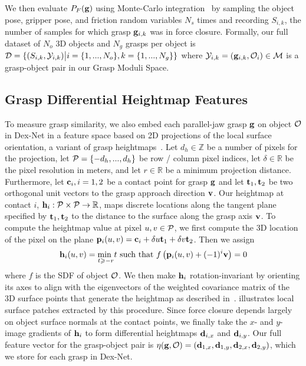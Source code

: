 We then evaluate $P_F(\mathbf{g})$ using Monte-Carlo integration~\cite{kehoe2012toward} by sampling the object pose, gripper pose, and friction random variables $N_s$ times and recording $S_{i,k}$, the number of samples for which grasp $\mathbf{g}_{i,k}$ was in force closure.
Formally, our full dataset of $N_o$ 3D objects and $N_g$ grasps per object is $\mathcal{D} = \{ (S_{i, k}, \mathcal{Y}_{i, k}) \big| i = \{1, ..., N_o\}, k = \{1, ..., N_g\} \}$ where $\mathcal{Y}_{i,k} = (\mathbf{g}_{i, k}, \mathcal{O}_i) \in \mathcal{M}$ is a grasp-object pair in our Grasp Moduli Space.



\subsection{Grasp Differential Heightmap Features}
To measure grasp similarity, we also embed each parallel-jaw grasp $\mathbf{g}$ on object $\mathcal{O}$ in Dex-Net in a feature space based on 2D projections of the local surface orientation, a variant of grasp heightmaps~\cite{herzog2012template, kappler2015leveraging}.
Let $d_h \in \mathbb{Z}$ be a number of pixels for the projection, let $\mathcal{P} = \{-d_h, ..., d_h\}$ be row / column pixel indices, let $\delta \in \mathbb{R}$ be the pixel resolution in meters, and let $r \in \mathbb{R}$ be a minimum projection distance.
Furthermore, let $\mathbf{c}_i, i = 1, 2$ be a contact point for grasp $\mathbf{g}$ and let $\mathbf{t}_1, \mathbf{t}_2$ be two orthogonal unit vectors to the grasp approach direction $\mathbf{v}$.
Our heightmap at contact $i$, $\mathbf{h}_{i}: \mathcal{P} \times \mathcal{P} \rightarrow \mathbb{R}$, maps discrete locations along the tangent plane specified by $\mathbf{t}_1, \mathbf{t}_2$ to the distance to the surface along the grasp axis $\mathbf{v}$.
To compute the heightmap value at pixel $u,v \in \mathcal{P}$, we first compute the 3D location of the pixel on the plane $\mathbf{p}_i(u,v) = \mathbf{c}_i + \delta u \mathbf{t}_1 + \delta v \mathbf{t}_2$.
Then we assign
\begin{align*}
	\mathbf{h}_i(u,v) = \underset{t \geqslant -r}{\text{min }} t \text{ such that } f\left( \mathbf{p}_i(u,v) + (-1)^{i} \mathbf{v} \right) = 0
\end{align*}
\noindent where $f$ is the SDF of object $\mathcal{O}$. 
We then make $\mathbf{h}_i$ rotation-invariant by orienting its axes to align with the eigenvectors of the weighted covariance matrix of the 3D surface points that generate the heightmap as described in~\cite{tombariunique}.
 illustrates local surface patches extracted by this procedure.
Since force closure depends largely on object surface normals at the contact points, we finally take the $x$- and $y$-image gradients of $\mathbf{h}_i$ to form differential heightmaps $\mathbf{d}_{i,x}$ and $\mathbf{d}_{i,y}$.
Our full feature vector for the grasp-object pair is $\eta(\mathbf{g}, \mathcal{O}) = (\mathbf{d}_{1,x}, \mathbf{d}_{1,y}, \mathbf{d}_{2,x}, \mathbf{d}_{2,y})$, which we store for each grasp in Dex-Net.

